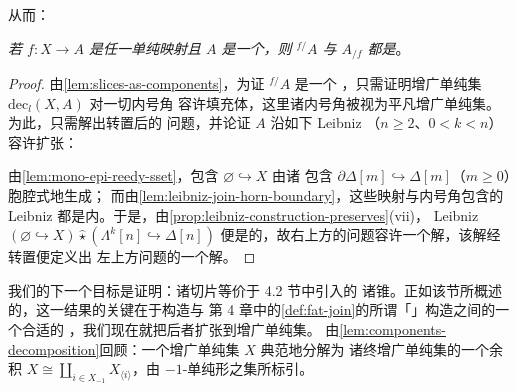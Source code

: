 从而：

\begin{corollary}\label{cor:slices-are-quasi-categories}
\emph{若 $f\colon X\to A$ 是任一单纯映射且 $A$ 是一个\trQuasiCategory，则%
${}^{f/}\!A$ 与 $A_{/f}$ 都是\trQuasiCategory}。
\end{corollary}

\begin{proof}
由\cref{lem:slices-as-components}，为证 ${}^{f/}\!A$ 是一个%
\trQuasiCategory，只需证明增广单纯集 $\mathrm{dec}_{l}(X,A)$ 对一切内号角%
容许填充体，这里诸内号角被视为平凡增广单纯集。为此，只需解出转置后的%
\trLifting{}问题，并论证 $A$ 沿如下 Leibniz \trJoin（$n\ge 2$、$0<k<n$）%
容许扩张：
\begin{center}
\end{center}
由\cref{lem:mono-epi-reedy-sset}，包含 $\varnothing\hookrightarrow X$ 由诸%
包含 $\partial\Delta[m]\hookrightarrow\Delta[m]$（$m\ge 0$）胞腔式地生成；%
而由\cref{lem:leibniz-join-horn-boundary}，这些映射与内号角包含的 Leibniz
\trJoin{}都是内\trAnodyneExtension。于是，由\cref{prop:leibniz-construction-preserves}(vii)，%
Leibniz \trJoin%
$(\varnothing\hookrightarrow X)\mathbin{\hat{\star}}(\Lambda^{k}[n]\hookrightarrow\Delta[n])$
便是\trInnerAnodyne{}的，故右上方的\trLifting{}问题容许一个解，该解经转置便定义出%
左上方\trLifting{}问题的一个解。
\end{proof}

我们的下一个目标是证明：诸切片\trQuasiCategory{}等价于 4.2 节中引入的%
诸锥\trQuasiCategory。正如该节所概述的，这一结果的关键在于\trJoin{}构造与%
第 4 章中的\cref{def:fat-join}的所谓「\trFatJoin」构造之间的一个合适的%
\trEquivalence，我们现在就把后者扩张到增广单纯集。
由\cref{lem:components-decomposition}回顾：一个增广单纯集 $X$ 典范地分解为%
诸终增广单纯集的一个余积
$X\cong\coprod_{i\in X_{-1}}X_{\langle i\rangle}$，由 $-1$-单纯形之集所标引。

